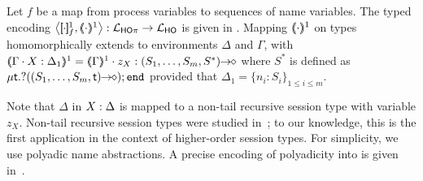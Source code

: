 \documentclass[runningheads]{llncs}
\begin{document}
{{\begin{definition}
\label{d:enc:hopitoho}
Let $f$ be a map from process variables to sequences of name variables.
%
The typed encoding 
$\enco{\map{\cdot}^{1}_f, \mapt{\cdot}^{1} %
}: \tyl{L}_{\HOp} \to \tyl{L}_{\HO}$ is given in 
. 
Mapping $(\!\!\langle\cdot\rangle\!\!)^{1}$ on types homomorphically extends to 
environments $\Delta$
and
$\Gamma$, with
$
\tmap{\Gamma \cat \varp{X}:\Delta_1}{1}  =  \tmap{\Gamma}{1} \cat z_X:\shot{(S_1,\ldots,S_m,S^*)}
$
where  
$S^*$ is defined as $\mu\mathsf{t}.? ((S_1,\ldots,S_m,\mathsf{t})\!\! \rightarrow\!\! \diamond) ; \mathtt{end}$
provided that $\Delta_1 = \{n_i:S_i\}_{1\leq i\leq m}$.
\end{definition}



Note that $\Delta$ in $X:\Delta$ is mapped to a non-tail
recursive session type with variable $z_X$. %
Non-tail
recursive session types {were} studied in~\cite{DBLP:journals/corr/abs-1202-2086,TGC14};
{to our knowledge,}
this is the first application in the
context of higher-order session types.
For simplicity,  %
we use polyadic name abstractions.
A precise encoding of polyadicity into \HO is given in~.

}}
\end{document}
